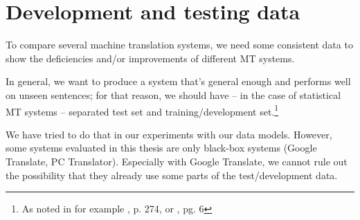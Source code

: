 \section{Development and testing data}

To compare several machine translation systems, we need some consistent data to show the deficiencies and/or improvements of different MT systems.

In general, we want to produce a system that's general enough and performs well on unseen sentences; for that reason, we should have -- in the case of statistical MT systems -- separated test set and training/development set.\footnote{As noted in for example \cite{koehn2010statistical}, p. 274, or \cite{bishop}, pg. 6}

We have tried to do that in our experiments with our data models. However, some systems evaluated in this thesis are only black-box systems (Google Translate, PC Translator). Especially with Google Translate, we cannot rule out the possibility that they already use some parts of the test/development data.




